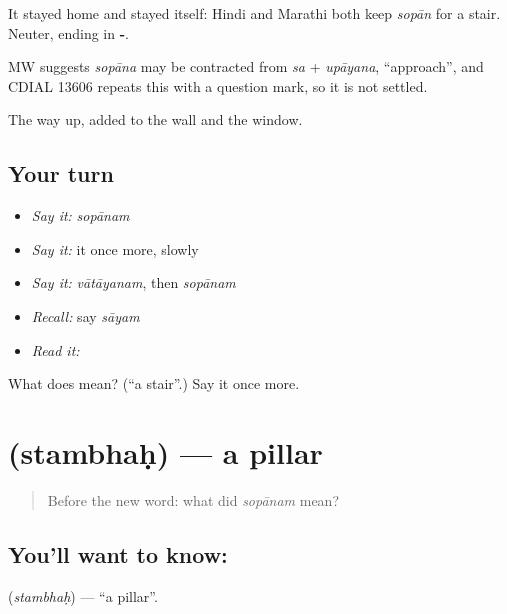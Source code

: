 It stayed home and stayed itself: Hindi and Marathi both keep \emph{sopān} for a stair. Neuter, ending in \textbf{-}.

\begin{cousinweb}
MW suggests \emph{sopāna} may be contracted from \emph{sa} + \emph{upāyana}, \textquotedblleft{}approach\textquotedblright{}, and CDIAL 13606 repeats this with a question mark, so it is not settled.
\end{cousinweb}

\begin{grammarlens}[title={What you've built}]
The way up, added to the wall and the window.
\end{grammarlens}

\subsection*{Your turn}
\begin{itemize}
\raggedright
  \item \emph{Say it:} \emph{sopānam}
  \item \emph{Say it:} it once more, slowly
  \item \emph{Say it:} \emph{vātāyanam}, then \emph{sopānam}
  \item \emph{Recall:} say \emph{sāyam}
  \item \emph{Read it:} \textbf{}
\end{itemize}

\begin{tcolorbox}[breakable,colback=teal!4,colframe=teal!35!black,title={Before you move on}]
What does  mean? (\textquotedblleft{}a stair\textquotedblright{}.) Say it once more.
\end{tcolorbox}
\section[\texorpdfstring{\sk{स्तम्भः} (stambhaḥ)}{स्तम्भः (stambhaḥ)}]{ (stambhaḥ) — a pillar}

\label{lesson:SA-C47-pillar}



\begin{quote}
Before the new word: what did \emph{sopānam} mean?
\end{quote}

\subsection*{You'll want to know: }
\textbf{} (\emph{stambhaḥ}) — \textquotedblleft{}a pillar\textquotedblright{}.

